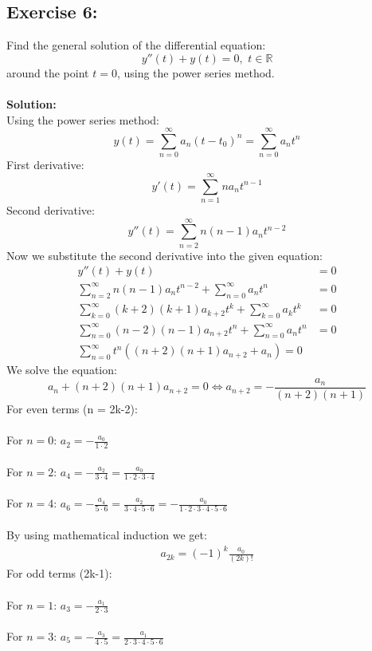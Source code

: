\documentclass{article}
\begin{document}
\subsection{Exercise 6:}
Find the general solution of the differential equation:
$$y''(t)+y(t) = 0, \,\, t \in \mathbb{R}$$
around the point $t = 0$, using the power series method. \\ \\
\textbf{Solution:} \\
Using the power series method:
$$y(t) = \sum_{n = 0}^{\infty}a_n(t-t_0)^n = \sum_{n = 0}^{\infty}a_nt^n$$
First derivative:
$$y'(t) = \sum_{n = 1}^{\infty}na_nt^{n-1}$$
Second derivative:
$$y''(t) = \sum_{n = 2}^{\infty}n(n-1)a_nt^{n-2}$$
Now we substitute the second derivative into the given equation:
\begin{align*}
    y''(t)+y(t) &= 0 \\
    \sum_{n = 2}^{\infty}n(n-1)a_nt^{n-2}+\sum_{n = 0}^{\infty}a_nt^n &= 0\\
    \sum_{k = 0}^{\infty}(k+2)(k+1)a_{k+2}t^k+\sum_{k = 0}^{\infty}a_kt^k &= 0 \\
    \sum_{n = 0}^{\infty}(n-2)(n-1)a_{n+2}t^n+\sum_{n = 0}^{\infty}a_nt^n &= 0 \\
    \sum_{n = 0}^{\infty}t^n((n+2)(n+1)a_{n+2}+a_n) = 0
\end{align*}
We solve the equation:
$$a_n+(n+2)(n+1)a_{n+2} = 0 \iff a_{n+2} = -\frac{a_n}{(n+2)(n+1)}$$
For even terms (n = 2k-2): \\ \\
For $n = 0: \, a_2 = -\frac{a_0}{1\cdot2} $ \\ \\
For $n = 2: \, a_4 = -\frac{a_2}{3\cdot4} = \frac{a_0}{1\cdot2\cdot3\cdot4}$ \\ \\
For $n = 4: \, a_6 = -\frac{a_4}{5\cdot6} = \frac{a_2}{3\cdot4\cdot5\cdot6} = -\frac{a_0}{1\cdot2\cdot3\cdot4\cdot5\cdot6}$ \\ \\
By using mathematical induction we get:
\begin{align*}
    a_{2k} = (-1)^k\frac{a_0}{(2k)!} \tag{1} \label{even}
\end{align*}    
For odd terms (2k-1): \\ \\
For $n = 1: \, a_3 = -\frac{a_1}{2\cdot3}$ \\ \\
For $n = 3: \, a_5 = -\frac{a_3}{4\cdot5} = \frac{a_1}{2\cdot3\cdot4\cdot5\cdot6}$ \\ \\
\end{document}
